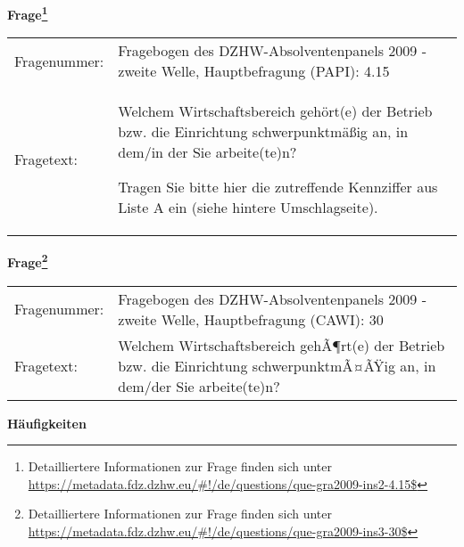 				\vspace*{0.5cm}
                \noindent\textbf{Frage\footnote{Detailliertere Informationen zur Frage finden sich unter
		              \url{https://metadata.fdz.dzhw.eu/\#!/de/questions/que-gra2009-ins2-4.15$}}}\\
				\begin{tabularx}{\hsize}{@{}lX}
					Fragenummer: &
					  Fragebogen des DZHW-Absolventenpanels 2009 - zweite Welle, Hauptbefragung (PAPI):
					  4.15
 \\
					Fragetext: & Welchem Wirtschaftsbereich gehört(e) der Betrieb bzw. die Einrichtung schwerpunktmäßig an, in dem/in der Sie arbeite(te)n?\par  Tragen Sie bitte hier die zutreffende Kennziffer aus Liste A ein (siehe hintere Umschlagseite). \\
				\end{tabularx}
				\vspace*{0.5cm}
                \noindent\textbf{Frage\footnote{Detailliertere Informationen zur Frage finden sich unter
		              \url{https://metadata.fdz.dzhw.eu/\#!/de/questions/que-gra2009-ins3-30$}}}\\
				\begin{tabularx}{\hsize}{@{}lX}
					Fragenummer: &
					  Fragebogen des DZHW-Absolventenpanels 2009 - zweite Welle, Hauptbefragung (CAWI):
					  30
 \\
					Fragetext: & Welchem Wirtschaftsbereich gehÃ¶rt(e) der Betrieb bzw. die Einrichtung schwerpunktmÃ¤ÃŸig an, in dem/der Sie arbeite(te)n? \\
				\end{tabularx}





        		\vspace*{0.5cm}
                \noindent\textbf{Häufigkeiten}

